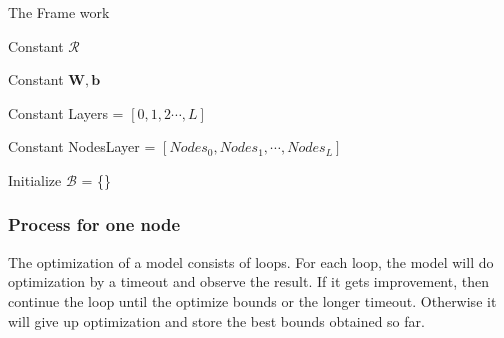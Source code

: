 \documentclass{llncs}
\begin{document}
\begin{algorithm}
	\caption{The Frame work}
	
	Constant $\mathcal{R}$  
	
	Constant $\boldsymbol{W}, \boldsymbol{b}$ 
	
	Constant Layers = $[0,1,2\cdots,L]$ 
	
	Constant NodesLayer = $[Nodes_0,Nodes_1,\cdots, Nodes_L]$ 
	
	
	Initialize $\mathcal{B}$ = \{\} 
	
	
	
\end{algorithm}

\subsubsection*{Process for one node}

 The optimization of a model consists of loops. For each loop, the model will do optimization by a timeout and observe the result. If it gets improvement, then continue the loop until the optimize bounds or the longer timeout. Otherwise it will give up optimization and store the best bounds obtained so far.  
\end{document}
